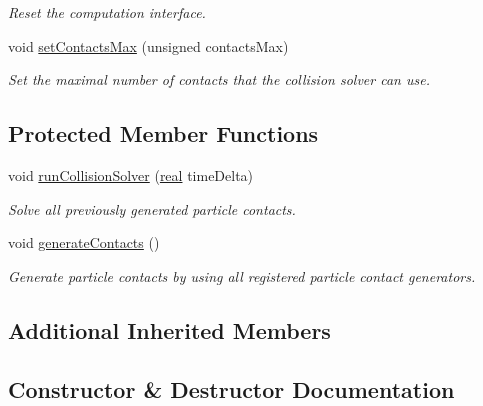 \begin{DoxyCompactItemize}
\begin{DoxyCompactList}\small\item\em Reset the computation interface. \end{DoxyCompactList}\item 
void \mbox{\hyperlink{classr3_1_1_default_particle_engine_c_i_a7dbb49cbf2f5b028656ea2e14174a3ed}{set\+Contacts\+Max}} (unsigned contacts\+Max)
\begin{DoxyCompactList}\small\item\em Set the maximal number of contacts that the collision solver can use. \end{DoxyCompactList}\end{DoxyCompactItemize}
\subsection*{Protected Member Functions}
\begin{DoxyCompactItemize}
\item 
void \mbox{\hyperlink{classr3_1_1_default_particle_engine_c_i_a19138f7707e948b7e8e05647bcba52fe}{run\+Collision\+Solver}} (\mbox{\hyperlink{namespacer3_ab2016b3e3f743fb735afce242f0dc1eb}{real}} time\+Delta)
\begin{DoxyCompactList}\small\item\em Solve all previously generated particle contacts. \end{DoxyCompactList}\item 
void \mbox{\hyperlink{classr3_1_1_default_particle_engine_c_i_a61aea4f32cc73960915d3c68396bd47e}{generate\+Contacts}} ()
\begin{DoxyCompactList}\small\item\em Generate particle contacts by using all registered particle contact generators. \end{DoxyCompactList}\end{DoxyCompactItemize}
\subsection*{Additional Inherited Members}


\subsection{Constructor \& Destructor Documentation}
\mbox{\label{classr3_1_1_default_particle_engine_c_i_a5f7619a5dd227d681d5dcbde6e8368eb}} 
